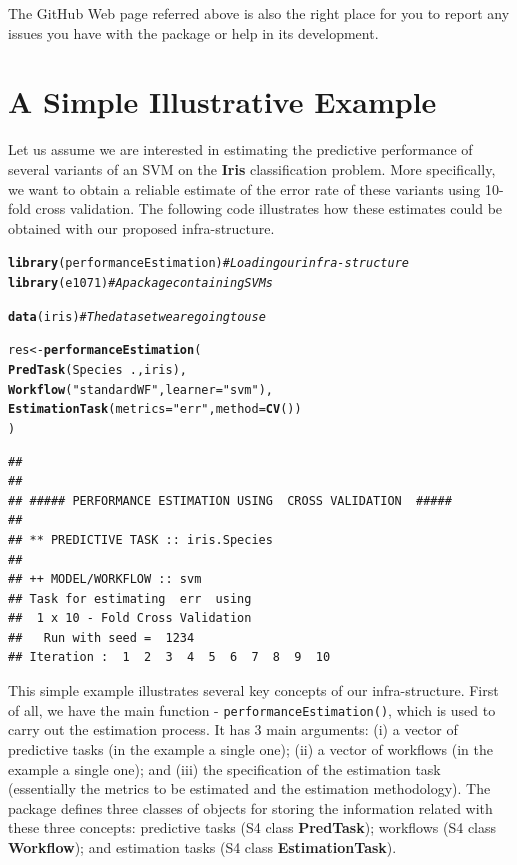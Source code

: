 \documentclass[10pt,a4paper]{article}\usepackage[]{graphicx}\usepackage[]{color}
\makeatletter
\newcommand{\hlstr}[1]{\textcolor[rgb]{0.192,0.494,0.8}{#1}}%
\newcommand{\hlcom}[1]{\textcolor[rgb]{0.678,0.584,0.686}{\textit{#1}}}%
\newcommand{\hlopt}[1]{\textcolor[rgb]{0,0,0}{#1}}%
\newcommand{\hlstd}[1]{\textcolor[rgb]{0.345,0.345,0.345}{#1}}%
\newcommand{\hlkwb}[1]{\textcolor[rgb]{0.69,0.353,0.396}{#1}}%
\newcommand{\hlkwc}[1]{\textcolor[rgb]{0.333,0.667,0.333}{#1}}%
\newcommand{\hlkwd}[1]{\textcolor[rgb]{0.737,0.353,0.396}{\textbf{#1}}}%
\newenvironment{kframe}{%
 \def\at@end@of@kframe{}%
 \ifinner\ifhmode%
  \def\at@end@of@kframe{\end{minipage}}%
  \begin{minipage}{\columnwidth}%
 \fi\fi%
 \def\FrameCommand##1{\hskip\@totalleftmargin \hskip-\fboxsep
 \colorbox{shadecolor}{##1}\hskip-\fboxsep
     \hskip-\linewidth \hskip-\@totalleftmargin \hskip\columnwidth}%
 \MakeFramed {\advance\hsize-\width
   \@totalleftmargin\z@ \linewidth\hsize
   \@setminipage}}%
 {\par\unskip\endMakeFramed%
 \at@end@of@kframe}
\newenvironment{knitrout}{}{} %
\makeatother
\begin{document}
The GitHub Web page referred above is also the right place for you to report any issues you have with the package or help in its development.


\section{A Simple Illustrative Example}\label{sec:simpleEx}

Let us assume we are interested in estimating the predictive performance of several variants of
an SVM on the
\textbf{Iris} classification problem. More specifically, we want to
obtain a reliable estimate of the error rate of these variants using
10-fold cross validation. The following code illustrates how these
estimates could be obtained with our proposed infra-structure.

\begin{knitrout}\footnotesize
{}\color{fgcolor}\begin{kframe}
\begin{alltt}
\hlkwd{library}\hlstd{(performanceEstimation)}  \hlcom{# Loading our infra-structure}
\hlkwd{library}\hlstd{(e1071)}                  \hlcom{# A package containing SVMs}

\hlkwd{data}\hlstd{(iris)}                      \hlcom{# The data set we are going to use}

\hlstd{res} \hlkwb{<-} \hlkwd{performanceEstimation}\hlstd{(}
         \hlkwd{PredTask}\hlstd{(Species} \hlopt{~} \hlstd{.,iris),}
         \hlkwd{Workflow}\hlstd{(}\hlstr{"standardWF"}\hlstd{,}\hlkwc{learner}\hlstd{=}\hlstr{"svm"}\hlstd{),}
         \hlkwd{EstimationTask}\hlstd{(}\hlkwc{metrics}\hlstd{=}\hlstr{"err"}\hlstd{,}\hlkwc{method}\hlstd{=}\hlkwd{CV}\hlstd{())}
         \hlstd{)}
\end{alltt}
\begin{verbatim}
## 
## 
## ##### PERFORMANCE ESTIMATION USING  CROSS VALIDATION  #####
## 
## ** PREDICTIVE TASK :: iris.Species
## 
## ++ MODEL/WORKFLOW :: svm 
## Task for estimating  err  using
##  1 x 10 - Fold Cross Validation
## 	 Run with seed =  1234 
## Iteration :  1  2  3  4  5  6  7  8  9  10
\end{verbatim}
\end{kframe}
\end{knitrout}

This simple example illustrates several key concepts of our
infra-structure. First of all, we have the main function  -
\texttt{performanceEstimation()}, which is used to carry out
the estimation process. It has 3 main arguments: (i) a vector of
predictive tasks (in the example a single one); (ii) a vector of workflows (in the example a single one); and (iii) the
specification of the estimation task (essentially the metrics to be estimated and the estimation methodology). The package defines three classes of objects for storing the information related with these three concepts: predictive tasks (S4 class \textbf{PredTask}); workflows (S4 class \textbf{Workflow}); and estimation tasks (S4 class \textbf{EstimationTask}).
\end{document}
